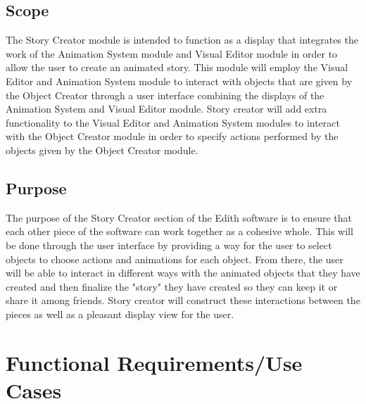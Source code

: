 \documentclass[12pt]{article}
\begin{document}
	\subsection{Scope}
	The Story Creator module is intended to function as a display that integrates the work of the Animation System module and Visual Editor module in order to allow the user to create an animated story.  This module will employ the Visual Editor and Animation System module to interact with objects that are given by the Object Creator through a user interface combining the displays of the Animation System and Visual Editor module.  Story creator will add extra functionality to the Visual Editor and Animation System modules to interact with the Object Creator module in order to specify actions performed by the objects given by the Object Creator module.\
	\subsection{Purpose}
	The purpose of the Story Creator section of the Edith software is to ensure that each other piece of the software can work together as a cohesive whole. This will be done through the user interface by providing a way for the user to select objects to choose actions and animations for each object. From there, the user will be able to interact in different ways with the animated objects that they have created and then finalize the "story" they have created so they can keep it or share it among friends. Story creator will construct these interactions between the pieces as well as a pleasant display view for the user.
	
	
\section{Functional Requirements/Use Cases}
\end{document}
